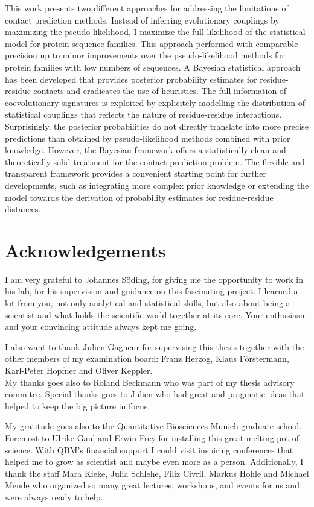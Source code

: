 \documentclass[11pt,a4paper,twoside]{book}
\theoremstyle{definition}
\theoremstyle{definition}
\theoremstyle{remark}
\begin{document}
This work presents two different approaches for addressing the
limitations of contact prediction methods. Instead of inferring
evolutionary couplings by maximizing the pseudo-likelihood, I maximize
the full likelihood of the statistical model for protein sequence
families. This approach performed with comparable precision up to minor
improvements over the pseudo-likelihood methods for protein families
with low numbers of sequences. A Bayesian statistical approach has been
developed that provides posterior probability estimates for
residue-residue contacts and eradicates the use of heuristics. The full
information of coevolutionary signatures is exploited by explicitely
modelling the distribution of statistical couplings that reflects the
nature of residue-residue interactions. Surprisingly, the posterior
probabilities do not directly translate into more precise predictions
than obtained by pseudo-likelihood methods combined with prior
knowledge. However, the Bayesian framework offers a statistically clean
and theoretically solid treatment for the contact prediction problem.
The flexible and transparent framework provides a convenient starting
point for further developments, such as integrating more complex prior
knowledge or extending the model towards the derivation of probability
estimates for residue-residue distances.

\chapter*{Acknowledgements}\label{acknowledgements}

I am very grateful to Johannes Söding, for giving me the opportunity to
work in his lab, for his supervision and guidance on this fascinating
project. I learned a lot from you, not only analytical and statistical
skills, but also about being a scientist and what holds the scientific
world together at its core. Your enthusiasm and your convincing attitude
always kept me going.

I also want to thank Julien Gagneur for supervising this thesis together
with the other members of my examination board: Franz Herzog, Klaus
Förstermann, Karl-Peter Hopfner and Oliver Keppler.\\
My thanks goes also to Roland Beckmann who was part of my thesis
advisory commitee. Special thanks goes to Julien who had great and
pragmatic ideas that helped to keep the big picture in focus.

My gratitude goes also to the Quantitative Biosciences Munich graduate
school. Foremost to Ulrike Gaul and Erwin Frey for installing this great
melting pot of science. With QBM's financial support I could visit
inspiring conferences that helped me to grow as scientist and maybe even
more as a person. Additionally, I thank the staff Mara Kieke, Julia
Schlehe, Filiz Civril, Markus Hohle and Michael Mende who organized so
many great lectures, workshops, and events for us and were always ready
to help.
\end{document}

